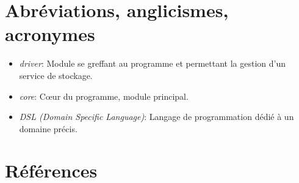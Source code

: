 \section{Abréviations, anglicismes, acronymes}

\begin{itemize}
\itemsep1pt\parskip0pt
\item
  \emph{driver}: Module se greffant au programme et permettant la
  gestion d'un service de stockage.
\item
  \emph{core}: Cœur du programme, module principal.
\item
  \emph{DSL (Domain Specific Language)}: Langage de programmation dédié
  à un domaine précis.
\end{itemize}

\section{Références}
